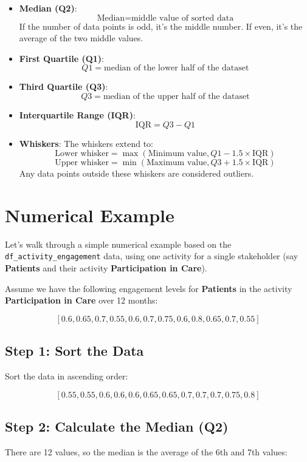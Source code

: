 \documentclass{article}
\begin{document}
	\begin{itemize}
		\item \textbf{Median (Q2)}:
		\[
		\text{Median} = \text{middle value of sorted data}
		\]
		If the number of data points is odd, it's the middle number. If even, it’s the average of the two middle values.
		
		\item \textbf{First Quartile (Q1)}:
		\[
		Q1 = \text{median of the lower half of the dataset}
		\]
		
		\item \textbf{Third Quartile (Q3)}:
		\[
		Q3 = \text{median of the upper half of the dataset}
		\]
		
		\item \textbf{Interquartile Range (IQR)}:
		\[
		\text{IQR} = Q3 - Q1
		\]
		
		\item \textbf{Whiskers}: The whiskers extend to:
		\[
		\text{Lower whisker} = \max(\text{Minimum value}, Q1 - 1.5 \times \text{IQR})
		\]
		\[
		\text{Upper whisker} = \min(\text{Maximum value}, Q3 + 1.5 \times \text{IQR})
		\]
		Any data points outside these whiskers are considered outliers.
	\end{itemize}
	
	\section*{Numerical Example}
	
	Let's walk through a simple numerical example based on the \texttt{df\_activity\_engagement} data, using one activity for a single stakeholder (say \textbf{Patients} and their activity \textbf{Participation in Care}).
	
	Assume we have the following engagement levels for \textbf{Patients} in the activity \textbf{Participation in Care} over 12 months:
	
	\[
	[0.6, 0.65, 0.7, 0.55, 0.6, 0.7, 0.75, 0.6, 0.8, 0.65, 0.7, 0.55]
	\]
	
	\subsection*{Step 1: Sort the Data}
	Sort the data in ascending order:
	
	\[
	[0.55, 0.55, 0.6, 0.6, 0.6, 0.65, 0.65, 0.7, 0.7, 0.7, 0.75, 0.8]
	\]
	
	\subsection*{Step 2: Calculate the Median (Q2)}
	There are 12 values, so the median is the average of the 6th and 7th values:
	
\end{document}
